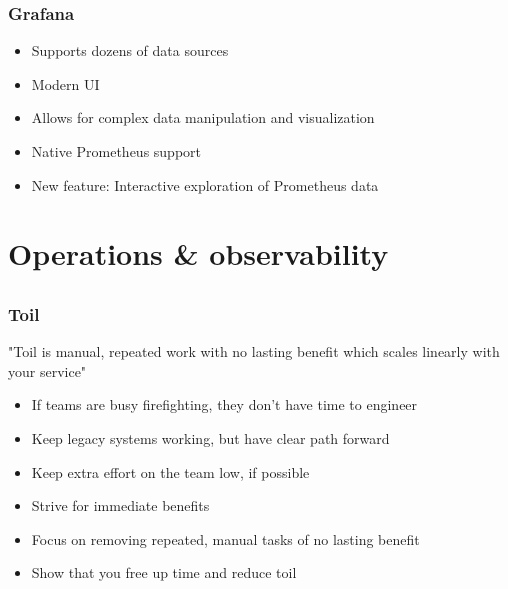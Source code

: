 \documentclass[t]{beamer}
\begin{document}
\begin{frame}
	\frametitle{Grafana}
	\begin{itemize}
		\item Supports dozens of data sources
		\item Modern UI
		\item Allows for complex data manipulation and visualization
		\item Native Prometheus support
		\item New feature: Interactive exploration of Prometheus data
	\end{itemize}
\end{frame}



\section{Operations \& observability}

\subsection{}

\begin{frame}
	\frametitle{Toil}
	"Toil is manual, repeated work with no lasting benefit which scales linearly with your service"
	\vfill
	\begin{itemize}
		\item If teams are busy firefighting, they don't have time to engineer
		\item Keep legacy systems working, but have clear path forward
		\item Keep extra effort on the team low, if possible
		\item Strive for immediate benefits
		\item Focus on removing repeated, manual tasks of no lasting benefit
		\item Show that you free up time and reduce toil
	\end{itemize}
	\vfill
\end{frame}
\end{document}
